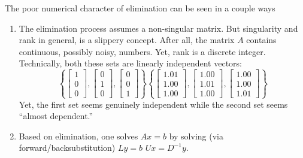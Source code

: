 \begin{enumerate}[label=(\roman*)]
    The poor numerical character of elimination can be seen in a couple ways
    \begin{enumerate}
        \item The elimination process assumes a non-singular matrix. But singularity and rank in general, is a slippery concept. After all, the matrix $A$ contains continuous, possibly noisy, numbers. Yet, rank is a discrete integer. Technically, both these sets are linearly independent vectors:
        \[ 
            \left\{ 
                \begin{bmatrix} 
                    1 \\ 
                    0 \\
                    0
                \end{bmatrix},
                \begin{bmatrix} 
                    0 \\ 
                    1 \\
                    0
                \end{bmatrix},
                \begin{bmatrix} 
                    0 \\ 
                    0 \\
                    1
                \end{bmatrix}
            \right\}
            \left\{ 
                \begin{bmatrix} 
                    1.01 \\ 
                    1.00 \\
                    1.00
                \end{bmatrix},
                \begin{bmatrix} 
                    1.00 \\ 
                    1.01 \\
                    1.00
                \end{bmatrix},
                \begin{bmatrix} 
                    1.00 \\ 
                    1.00 \\
                    1.01
                \end{bmatrix}
            \right\}
        \]
        Yet, the first set seems genuinely independent while the second set seems ``almost dependent.''
        
        \item Based on elimination, one solves $Ax=b$ by solving (via forward/backsubstitution) $Ly=b$ $Ux=D^{-1}y$.
        

\end{enumerate}
\end{enumerate}
